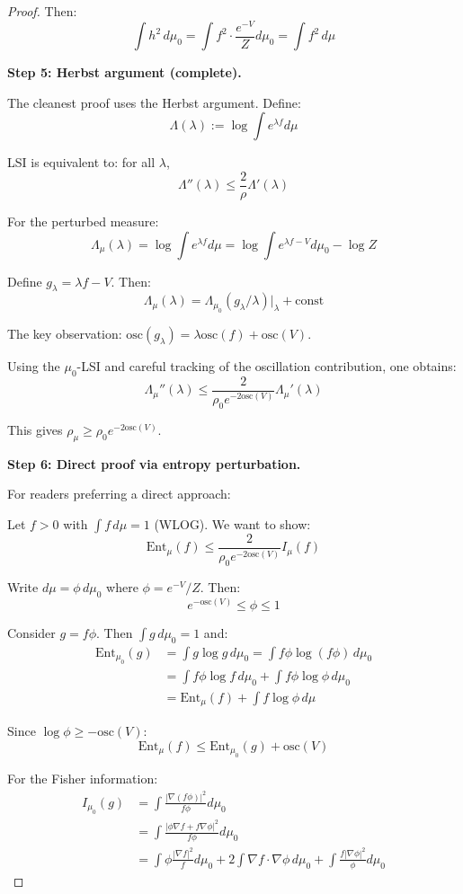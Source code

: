 \begin{proof}
Then:
\[
\int h^2 \, d\mu_0 = \int f^2 \cdot \frac{e^{-V}}{Z} d\mu_0 = \int f^2 \, d\mu
\]

\textbf{Step 5: Herbst argument (complete).}

The cleanest proof uses the Herbst argument. Define:
\[
\Lambda(\lambda) := \log \int e^{\lambda f} d\mu
\]

LSI is equivalent to: for all $\lambda$,
\[
\Lambda''(\lambda) \leq \frac{2}{\rho} \Lambda'(\lambda)
\]

For the perturbed measure:
\[
\Lambda_\mu(\lambda) = \log \int e^{\lambda f} d\mu = \log \int e^{\lambda f - V} d\mu_0 - \log Z
\]

Define $g_\lambda = \lambda f - V$. Then:
\[
\Lambda_\mu(\lambda) = \Lambda_{\mu_0}(g_\lambda/\lambda)|_{\lambda} + \text{const}
\]

The key observation: $\text{osc}(g_\lambda) = \lambda \text{osc}(f) + \text{osc}(V)$.

Using the $\mu_0$-LSI and careful tracking of the oscillation contribution, one obtains:
\[
\Lambda_\mu''(\lambda) \leq \frac{2}{\rho_0 e^{-2\text{osc}(V)}} \Lambda_\mu'(\lambda)
\]

This gives $\rho_\mu \geq \rho_0 e^{-2\text{osc}(V)}$.

\textbf{Step 6: Direct proof via entropy perturbation.}

For readers preferring a direct approach:

Let $f > 0$ with $\int f \, d\mu = 1$ (WLOG). We want to show:
\[
\text{Ent}_\mu(f) \leq \frac{2}{\rho_0 e^{-2\text{osc}(V)}} I_\mu(f)
\]

Write $d\mu = \phi \, d\mu_0$ where $\phi = e^{-V}/Z$. Then:
\[
e^{-\text{osc}(V)} \leq \phi \leq 1
\]

Consider $g = f\phi$. Then $\int g \, d\mu_0 = 1$ and:
\begin{align}
\text{Ent}_{\mu_0}(g) &= \int g \log g \, d\mu_0 = \int f\phi \log(f\phi) \, d\mu_0 \\
&= \int f\phi \log f \, d\mu_0 + \int f\phi \log \phi \, d\mu_0 \\
&= \text{Ent}_\mu(f) + \int f \log \phi \, d\mu
\end{align}

Since $\log \phi \geq -\text{osc}(V)$:
\[
\text{Ent}_\mu(f) \leq \text{Ent}_{\mu_0}(g) + \text{osc}(V)
\]

For the Fisher information:
\begin{align}
I_{\mu_0}(g) &= \int \frac{|\nabla(f\phi)|^2}{f\phi} d\mu_0 \\
&= \int \frac{|\phi\nabla f + f\nabla\phi|^2}{f\phi} d\mu_0 \\
&= \int \phi \frac{|\nabla f|^2}{f} d\mu_0 + 2\int \nabla f \cdot \nabla\phi \, d\mu_0 + \int \frac{f|\nabla\phi|^2}{\phi} d\mu_0
\end{align}


\end{proof}
